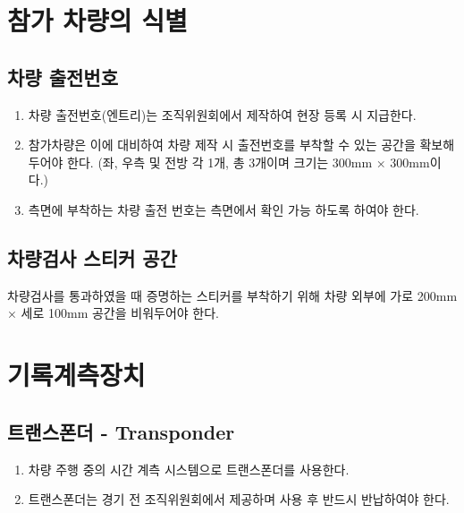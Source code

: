 \documentclass[final,a4paper,10pt]{report}
\begin{document}
\chapter{참가 차량의 식별}

\section{차량 출전번호}\label{rule:formula-technical.vehicle-number} \label{section:차량 출전번호}
\begin{enumerate}
  \item\label{rule:formula-technical.vehicle-number.issued-at-registration} 차량 출전번호(엔트리)는 조직위원회에서 제작하여 현장 등록 시 지급한다.
  \item\label{rule:formula-technical.vehicle-number.mounting-space-300mm} 참가차량은 이에 대비하여 차량 제작 시 출전번호를 부착할 수 있는 공간을 확보해 두어야 한다. (좌, 우측 및 전방 각 1개, 총 3개이며 크기는 300mm × 300mm이다.)
  \item\label{rule:formula-technical.vehicle-number.side-visibility} 측면에 부착하는 차량 출전 번호는 측면에서 확인 가능 하도록 하여야 한다.
\end{enumerate}

\section{차량검사 스티커 공간}\label{rule:formula-technical.inspection-sticker-area}
차량검사를 통과하였을 때 증명하는 스티커를 부착하기 위해 차량 외부에 가로 200mm × 세로 100mm 공간을 비워두어야 한다.

\chapter{기록계측장치}

\section{트랜스폰더 - Transponder}\label{rule:formula-technical.transponder}
\begin{enumerate}
  \item\label{rule:formula-technical.transponder.timing-system} 차량 주행 중의 시간 계측 시스템으로 트랜스폰더를 사용한다.
  \item\label{rule:formula-technical.transponder.provided-and-returned} 트랜스폰더는 경기 전 조직위원회에서 제공하며 사용 후 반드시 반납하여야 한다.
\end{enumerate}
\end{document}
